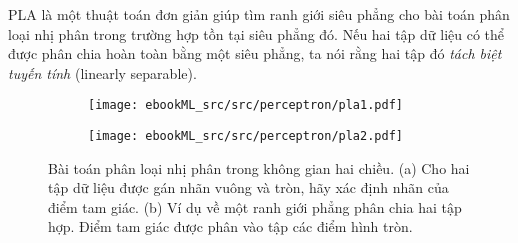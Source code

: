 PLA là một thuật toán đơn giản giúp tìm ranh giới siêu phẳng cho bài toán phân loại nhị phân trong trường hợp tồn tại siêu phẳng đó. Nếu hai tập dữ liệu có thể được phân chia hoàn toàn bằng một siêu phẳng, ta nói rằng hai tập đó \textit{tách biệt tuyến tính} ({linearly separable}).       



\begin{figure}[t]
     \begin{subfigure}{0.49\textwidth}
     \texttt{[image: ebookML\_src/src/perceptron/pla1.pdf]}
     \caption{}
     \label{fig:9_1a}
     \end{subfigure}
     \begin{subfigure}{0.49\textwidth}
     \texttt{[image: ebookML\_src/src/perceptron/pla2.pdf]}
     \caption{}
     \label{fig:9_1b}
     \end{subfigure}
     \caption{
      Bài toán phân loại nhị phân trong không gian hai chiều. (a) Cho hai tập dữ liệu được gán nhãn vuông và tròn, hãy xác định nhãn của điểm tam giác. (b) Ví dụ về một ranh giới phẳng phân chia hai tập hợp. Điểm tam giác được phân vào tập các điểm hình tròn.
     }
     \label{fig:9_1}
 \end{figure}
  




 
 

 



 
